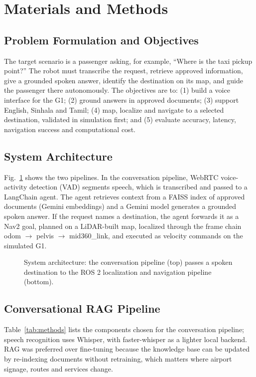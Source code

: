 \documentclass[conference]{IEEEtran}
\begin{document}
\section{Materials and Methods}

\subsection{Problem Formulation and Objectives}
The target scenario is a passenger asking, for example, ``Where is the taxi pickup point?'' The robot must transcribe the request, retrieve approved information, give a grounded spoken answer, identify the destination on its map, and guide the passenger there autonomously. The objectives are to: (1) build a voice interface for the G1; (2) ground answers in approved documents; (3) support English, Sinhala and Tamil; (4) map, localize and navigate to a selected destination, validated in simulation first; and (5) evaluate accuracy, latency, navigation success and computational cost.

\subsection{System Architecture}
Fig.~\ref{fig:architecture} shows the two pipelines. In the conversation pipeline, WebRTC voice-activity detection (VAD) segments speech, which is transcribed and passed to a LangChain agent. The agent retrieves context from a FAISS index of approved documents (Gemini embeddings) and a Gemini model generates a grounded spoken answer. If the request names a destination, the agent forwards it as a Nav2 goal, planned on a LiDAR-built map, localized through the frame chain odom $\rightarrow$ pelvis $\rightarrow$ mid360\_link, and executed as velocity commands on the simulated G1.

\begin{figure}[htbp]
\centering
\caption{System architecture: the conversation pipeline (top) passes a spoken destination to the ROS 2 localization and navigation pipeline (bottom).}
\label{fig:architecture}
\end{figure}

\subsection{Conversational RAG Pipeline}
Table~\ref{tab:methods} lists the components chosen for the conversation pipeline; speech recognition uses Whisper, with faster-whisper \cite{systran_fasterwhisper} as a lighter local backend. RAG was preferred over fine-tuning because the knowledge base can be updated by re-indexing documents without retraining, which matters where airport signage, routes and services change.
\end{document}
